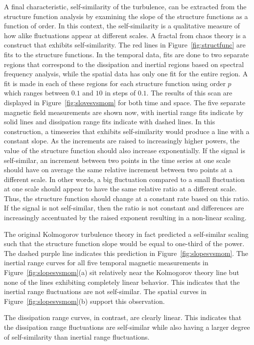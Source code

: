\documentclass[aps,prl,amsmath,amssymb,reprint,superscriptaddress]{revtex4-1} %
\begin{document}
A final characteristic, self-similarity of the turbulence, can be extracted from the structure function analysis by examining the slope of the structure functions as a function of order. In this context, the self-similarity is a qualitative measure of how alike fluctuations appear at different scales. A fractal from chaos theory is a construct that exhibits self-similarity. The red lines in Figure~\ref{fig:structfunc} are fits to the structure functions. In the temporal data, fits are done to two separate regions that correspond to the dissipation and inertial regions based on spectral frequency analysis, while the spatial data has only one fit for the entire region. A fit is made in each of these regions for each structure function using order $p$ which ranges between $0.1$ and $10$ in steps of $0.1$. The results of this scan are displayed in Figure~\ref{fig:slovesvsmom} for both time and space. The five separate magnetic field measurements are shown now, with inertial range fits indicate by solid lines and dissipation range fits indicate with dashed lines. In this construction, a timeseries that exhibits self-similarity would produce a line with a constant slope. As the increments are raised to increasingly higher powers, the value of the structure function should also increase exponentially. If the signal is self-similar, an increment between two points in the time series at one scale should have on average the same relative increment between two points at a different scale. In other words, a big fluctuation compared to a small fluctuation at one scale should appear to have the same relative ratio at a different scale. Thus, the structure function should change at a constant rate based on this ratio. If the signal is not self-similar, then the ratio is not constant and differences are increasingly accentuated by the raised exponent resulting in a non-linear scaling.

The original Kolmogorov turbulence theory in fact predicted a self-similar scaling such that the structure function slope would be equal to one-third of the power. The dashed purple line indicates this prediction in Figure~\ref{fig:slopesvsmom}. The inertial range curves for all five temporal magnetic measurements in Figure~\ref{fig:slopesvsmom}(a) sit relatively near the Kolmogorov theory line but none of the lines exhibiting completely linear behavior. This indicates that the inertial range fluctuations are not self-similar. The spatial curves in Figure~\ref{fig:slopesvsmom}(b) support this observation.

The dissipation range curves, in contrast, are clearly linear. This indicates that the dissipation range fluctuations are self-similar while also having a larger degree of self-similarity than inertial range fluctuations.
\end{document}
